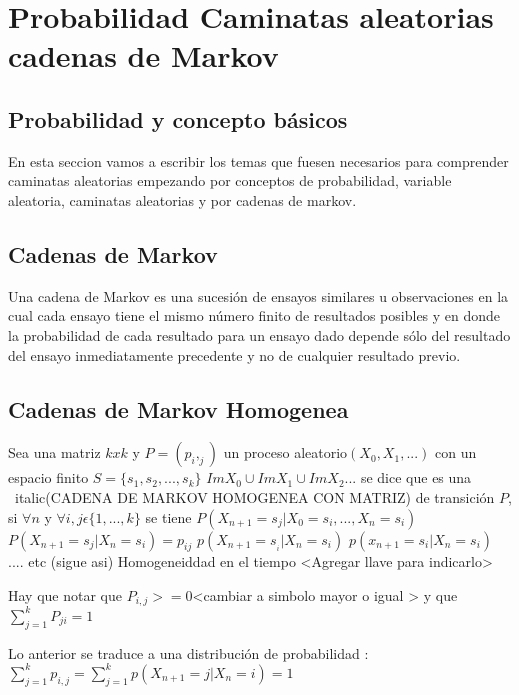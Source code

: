 \chapter{Probabilidad Caminatas aleatorias   cadenas de Markov} %
\label{Chapter1}


\section{Probabilidad y concepto b\'asicos}
En esta seccion vamos a escribir los temas que fuesen necesarios para comprender
caminatas aleatorias empezando por conceptos de probabilidad, variable aleatoria,
caminatas aleatorias y por cadenas de markov.
\section{Cadenas de Markov}



Una cadena de Markov es una sucesi\'on de ensayos similares u observaciones en la cual cada ensayo tiene el mismo n\'umero finito de resultados posibles y en donde la probabilidad de cada resultado para un ensayo dado depende s\'olo del resultado del ensayo inmediatamente precedente y no de cualquier resultado previo.


\section{Cadenas de Markov Homogenea}

Sea una matriz $k x k$ y $P = (p_i,_j)$ un proceso aleatorio$(X_0,X_1,...)$ con un espacio finito $S = \{s_1,s_2,...,s_k\}$ $ Im X_0 \cup Im X_1 \cup ImX_2$... se dice que es una ~italic(CADENA DE MARKOV HOMOGENEA CON MATRIZ) de transici\'on $P$, si $\forall n$ y $\forall i,j \epsilon \{1,...,k\} $ se tiene $P(X_{n +1} = s_j | X_0 = s_i,..., X_n = s_i)$\\


$ P (X_{n+1} = s_j | X_n = s_i) = p_{ij}$
$p(X_{n + 1} = s_{_i} |X_n = s_i )$
$p(x_{n+1} = s_i | X _n = s_i) $
.... etc (sigue asi)
Homogeneiddad en el tiempo
<Agregar llave  para indicarlo>

Hay que notar que $P_{i,j} >= 0$<cambiar a simbolo mayor o igual > y que $\sum_{j=1}^{k}P_{ji} = 1$

Lo anterior se traduce a una  distribuci\'on de probabilidad :
$\sum_{j = 1}^{k}p_{i,j} = \sum_{j = 1}^k p(X_{n +1} = j | X_n = i) = 1$

